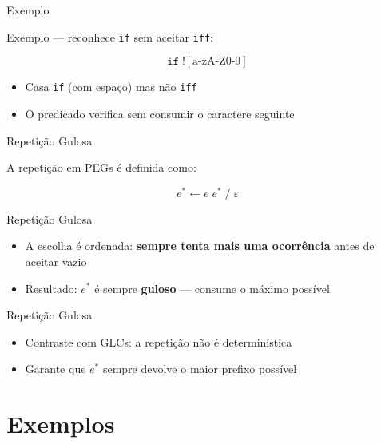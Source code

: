 \begin{frame}[fragile]{Exemplo}

    Exemplo --- reconhece \texttt{if} sem aceitar
    \texttt{iff}:

    \[\texttt{if}\; ![\text{a-zA-Z0-9}]\]

    \begin{itemize}

        \item
        Casa \texttt{if} (com espaço) mas não
        \texttt{iff}
        \item
        O predicado verifica sem consumir o caractere seguinte
    \end{itemize}
\end{frame}

\begin{frame}{Repetição Gulosa}

    A repetição em PEGs é definida como:

    \[e^* \leftarrow e\; e^* \;/\; \varepsilon\]
\end{frame}

\begin{frame}{Repetição Gulosa}

    \begin{itemize}

        \item
        A escolha é ordenada: \textbf{sempre tenta mais uma ocorrência} antes
        de aceitar vazio
        \item
        Resultado: \(e^*\) é sempre \textbf{guloso} --- consume o máximo
        possível
    \end{itemize}
\end{frame}

\begin{frame}{Repetição Gulosa}

    \begin{itemize}

        \item
        Contraste com GLCs: a repetição não é determinística
        \item
        Garante que \(e^*\) sempre devolve o maior prefixo possível
    \end{itemize}
\end{frame}


\section{Exemplos}\label{exemplos}

